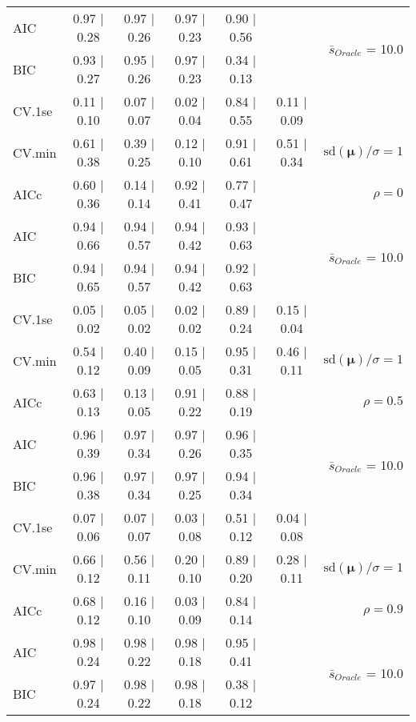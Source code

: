 \begin{table}
\begin{center}
\begin{tabular}{l*{5}{c}|r}
AIC & 0.97 $\mid$ 0.28 & 0.97 $\mid$ 0.26 & 0.97 $\mid$ 0.23 & 0.90 $\mid$ 0.56 & &  \multirow{2}{*}{$\bar{s}_{Oracle}$ = 10.0} \\
BIC & 0.93 $\mid$ 0.27 & 0.95 $\mid$ 0.26 & 0.97 $\mid$ 0.23 & 0.34 $\mid$ 0.13 & &  \\
 \hline 
CV.1se & 0.11 $\mid$ 0.10 & 0.07 $\mid$ 0.07 & 0.02 $\mid$ 0.04 & 0.84 $\mid$ 0.55 & 0.11 $\mid$ 0.09 & \\
CV.min & 0.61 $\mid$ 0.38 & 0.39 $\mid$ 0.25 & 0.12 $\mid$ 0.10 & 0.91 $\mid$ 0.61 & 0.51 $\mid$ 0.34 &  $\mathrm{sd}(\mathbf{\mu})/\sigma=1$ \\
AICc & 0.60 $\mid$ 0.36 & 0.14 $\mid$ 0.14 & 0.92 $\mid$ 0.41 & 0.77 $\mid$ 0.47 & & $\rho=0$ \\
AIC & 0.94 $\mid$ 0.66 & 0.94 $\mid$ 0.57 & 0.94 $\mid$ 0.42 & 0.93 $\mid$ 0.63 & &  \multirow{2}{*}{$\bar{s}_{Oracle}$ = 10.0} \\
BIC & 0.94 $\mid$ 0.65 & 0.94 $\mid$ 0.57 & 0.94 $\mid$ 0.42 & 0.92 $\mid$ 0.63 & &  \\
 \hline 
CV.1se & 0.05 $\mid$ 0.02 & 0.05 $\mid$ 0.02 & 0.02 $\mid$ 0.02 & 0.89 $\mid$ 0.24 & 0.15 $\mid$ 0.04 & \\
CV.min & 0.54 $\mid$ 0.12 & 0.40 $\mid$ 0.09 & 0.15 $\mid$ 0.05 & 0.95 $\mid$ 0.31 & 0.46 $\mid$ 0.11 &  $\mathrm{sd}(\mathbf{\mu})/\sigma=1$ \\
AICc & 0.63 $\mid$ 0.13 & 0.13 $\mid$ 0.05 & 0.91 $\mid$ 0.22 & 0.88 $\mid$ 0.19 & & $\rho=0.5$ \\
AIC & 0.96 $\mid$ 0.39 & 0.97 $\mid$ 0.34 & 0.97 $\mid$ 0.26 & 0.96 $\mid$ 0.35 & &  \multirow{2}{*}{$\bar{s}_{Oracle}$ = 10.0} \\
BIC & 0.96 $\mid$ 0.38 & 0.97 $\mid$ 0.34 & 0.97 $\mid$ 0.25 & 0.94 $\mid$ 0.34 & &  \\
 \hline 
CV.1se & 0.07 $\mid$ 0.06 & 0.07 $\mid$ 0.07 & 0.03 $\mid$ 0.08 & 0.51 $\mid$ 0.12 & 0.04 $\mid$ 0.08 & \\
CV.min & 0.66 $\mid$ 0.12 & 0.56 $\mid$ 0.11 & 0.20 $\mid$ 0.10 & 0.89 $\mid$ 0.20 & 0.28 $\mid$ 0.11 &  $\mathrm{sd}(\mathbf{\mu})/\sigma=1$ \\
AICc & 0.68 $\mid$ 0.12 & 0.16 $\mid$ 0.10 & 0.03 $\mid$ 0.09 & 0.84 $\mid$ 0.14 & & $\rho=0.9$ \\
AIC & 0.98 $\mid$ 0.24 & 0.98 $\mid$ 0.22 & 0.98 $\mid$ 0.18 & 0.95 $\mid$ 0.41 & &  \multirow{2}{*}{$\bar{s}_{Oracle}$ = 10.0} \\
BIC & 0.97 $\mid$ 0.24 & 0.98 $\mid$ 0.22 & 0.98 $\mid$ 0.18 & 0.38 $\mid$ 0.12 & &  \\

\end{tabular}
\end{center}
\end{table}
